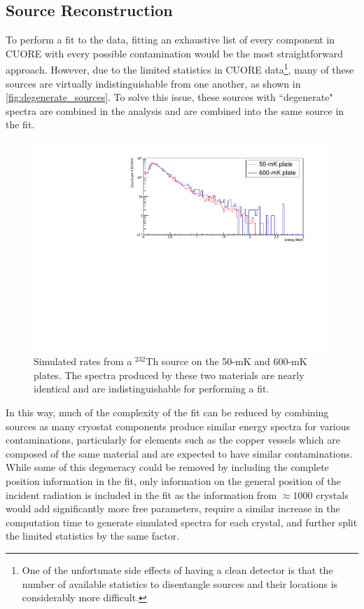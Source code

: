 \subsection*{Source Reconstruction}
To perform a fit to the data, fitting an exhaustive list of every component in CUORE with every possible contamination would be the most straightforward approach.
However, due to the limited statistics in CUORE data\footnote{One of the unfortunate side effects of having a clean detector is that the number of available statistics to disentangle sources and their locations is considerably more difficult.}, many of these sources are virtually indistinguishable from one another, as shown in \autoref{fig:degenerate_sources}.
To solve this issue, these sources with ``degenerate" spectra are combined in the analysis and are combined into the same source in the fit.
\begin{figure}[htbp]
    \centering
    \includegraphics[width=0.8\linewidth]{Figures/th232_copper_plates.pdf}
    \caption[Simulated rates from a $^{232}$Th source on the 50-mK and 600-mK plates.]
    {Simulated rates from a $^{232}$Th source on the 50-mK and 600-mK plates.
    The spectra produced by these two materials are nearly identical and are indistinguishable for performing a fit.}
    \label{fig:degenerate_sources}
\end{figure}
In this way, much of the complexity of the fit can be reduced by combining sources as many cryostat components produce similar energy spectra for various contaminations, particularly for elements such as the copper vessels which are composed of the same material and are expected to have similar contaminations.
While some of this degeneracy could be removed by including the complete position information in the fit, only information on the general position of the incident radiation is included in the fit as the information from $\approx1000$ crystals would add significantly more free parameters, require a similar increase in the computation time to generate simulated spectra for each crystal, and further split the limited statistics by the same factor.


